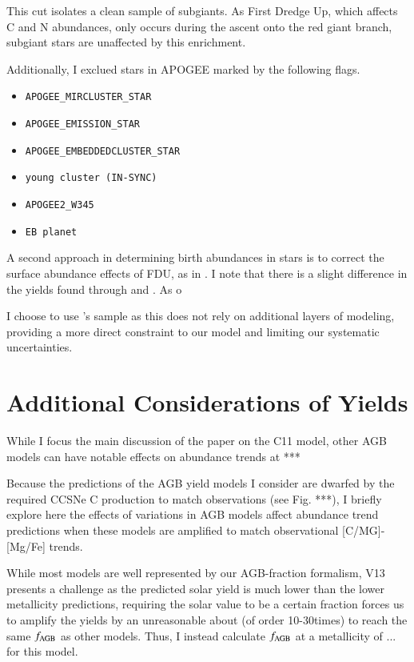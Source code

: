 \documentclass[12pt,oneside]{report}
\begin{document}
This cut isolates a clean sample of subgiants. As First Dredge Up, which affects C and N abundances, only occurs during the ascent onto the red giant branch, subgiant stars are unaffected by this enrichment. 

Additionally, I exclued stars in APOGEE marked by the following flags.
\begin{itemize}
\item \verb|APOGEE_MIRCLUSTER_STAR|
\item \verb|APOGEE_EMISSION_STAR|
\item \verb|APOGEE_EMBEDDEDCLUSTER_STAR|
\item \verb|young cluster (IN-SYNC)|
\item \verb|APOGEE2_W345|
\item \verb|EB planet|
\end{itemize}

A second approach in determining birth abundances in stars is to correct the surface abundance effects of FDU, as in \cite{fiorenzo+21}. I note that there is a slight difference in the yields found through \cite{fiorenzo+21} and \cite{jack_subgiant}. As o

I choose to use \cite{jack_subgiant}'s sample as this does not rely on additional layers of modeling, providing a more direct constraint to our model and limiting our systematic uncertainties.

\newpage
\section{Additional Considerations of Yields}\label{sec:alt_agb}


While I focus the main discussion of the paper on the C11 model, other AGB models can have notable effects on abundance trends at ***

Because the predictions of the AGB yield models I consider are dwarfed by the
required CCSNe C production to match observations (see Fig. ***), I briefly explore here the effects of variations in AGB models affect abundance trend predictions when these models are amplified to match observational [C/MG]-[Mg/Fe] trends. 

While most models are well represented by our AGB-fraction formalism, V13 presents a challenge as the predicted solar yield is much lower than the lower metallicity predictions, requiring the solar value to be a certain fraction forces us to amplify the yields by an unreasonable about (of order 10-30times) to reach the same $f_{\rm AGB}$ as other models. Thus, I instead calculate $f_{\rm AGB}$ at a metallicity of ... for this model. 
\end{document}
